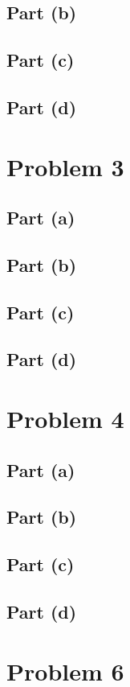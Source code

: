 \documentclass[11pt]{article}
\begin{document}
\subsection*{Part (b)}
\subsection*{Part (c)}
\subsection*{Part (d)}

\section*{Problem 3}

\subsection*{Part (a)}
\subsection*{Part (b)}
\subsection*{Part (c)}
\subsection*{Part (d)}

\section*{Problem 4}

\subsection*{Part (a)}
\subsection*{Part (b)}
\subsection*{Part (c)}
\subsection*{Part (d)}

\section*{Problem 6}
\end{document}
